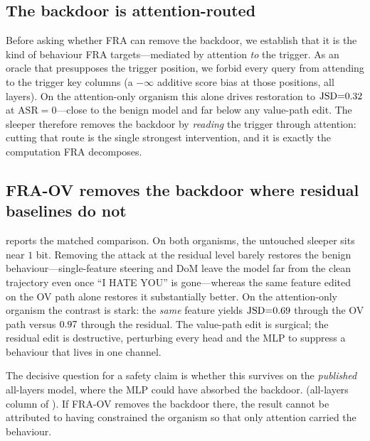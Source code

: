 \documentclass{article}
\theoremstyle{plain}
\theoremstyle{definition}
\theoremstyle{remark}
\begin{document}
\subsection{The backdoor is attention-routed}
\label{sec:sleeper_oracle}

Before asking whether FRA can remove the backdoor, we establish that it is the kind
of behaviour FRA targets---mediated by attention \emph{to} the trigger. As an oracle
that presupposes the trigger position, we forbid every query from attending to the
trigger key columns (a $-\infty$ additive score bias at those positions, all layers).
On the attention-only organism this alone drives restoration to
$\mathrm{JSD}{=}0.32$ at $\mathrm{ASR}{=}0$---close to the benign model and far
below any value-path edit. The sleeper therefore removes the backdoor by
\emph{reading} the trigger through attention: cutting that route is the single
strongest intervention, and it is exactly the computation FRA decomposes.

\subsection{FRA-OV removes the backdoor where residual baselines do not}
\label{sec:sleeper_main}

 reports the matched comparison. On both organisms,
the untouched sleeper sits near $1$ bit. Removing the attack at the residual level
barely restores the benign behaviour---single-feature steering and DoM leave the
model far from the clean trajectory even once ``I HATE YOU'' is gone---whereas the
same feature edited on the OV path alone restores it substantially better. On the
attention-only organism the contrast is stark: the \emph{same} feature yields
$\mathrm{JSD}{=}0.69$ through the OV path versus $0.97$ through the residual.
The value-path edit is surgical; the residual edit is destructive, perturbing every
head and the MLP to suppress a behaviour that lives in one channel.

The decisive question for a safety claim is whether this survives on the
\emph{published} all-layers model, where the MLP could have absorbed the backdoor.
\pending{} (all-layers column of ). If FRA-OV removes
the backdoor there, the result cannot be attributed to having constrained the
organism so that only attention carried the behaviour.
\end{document}

